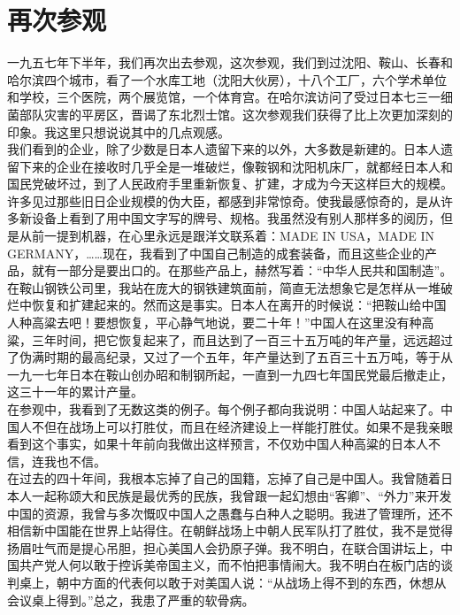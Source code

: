 \fancyhead[RO]{} %
\fancyhead[LE]{} %
\chapter*{再次参观}
\thispagestyle{empty}
一九五七年下半年，我们再次出去参观，这次参观，我们到过沈阳、鞍山、长春和哈尔滨四个城市，看了一个水库工地（沈阳大伙房），十八个工厂，六个学术单位和学校，三个医院，两个展览馆，一个体育宫。在哈尔滨访问了受过日本七三一细菌部队灾害的平房区，晋谒了东北烈士馆。这次参观我们获得了比上次更加深刻的印象。我这里只想说说其中的几点观感。\\

我们看到的企业，除了少数是日本人遗留下来的以外，大多数是新建的。日本人遗留下来的企业在接收时几乎全是一堆破烂，像鞍钢和沈阳机床厂，就都经日本人和国民党破坏过，到了人民政府手里重新恢复、扩建，才成为今天这样巨大的规模。许多见过那些旧日企业规模的伪大臣，都感到非常惊奇。使我最感惊奇的，是从许多新设备上看到了用中国文字写的牌号、规格。我虽然没有别人那样多的阅历，但是从前一提到机器，在心里永远是跟洋文联系着：MADE IN USA，MADE IN GERMANY，……现在，我看到了中国自己制造的成套装备，而且这些企业的产品，就有一部分是要出口的。在那些产品上，赫然写着：“中华人民共和国制造”。\\

在鞍山钢铁公司里，我站在庞大的钢铁建筑面前，简直无法想象它是怎样从一堆破烂中恢复和扩建起来的。然而这是事实。日本人在离开的时候说：“把鞍山给中国人种高粱去吧！要想恢复，平心静气地说，要二十年！”中国人在这里没有种高粱，三年时间，把它恢复起来了，而且达到了一百三十五万吨的年产量，远远超过了伪满时期的最高纪录，又过了一个五年，年产量达到了五百三十五万吨，等于从一九一七年日本在鞍山创办昭和制钢所起，一直到一九四七年国民党最后撤走止，这三十一年的累计产量。\\

在参观中，我看到了无数这类的例子。每个例子都向我说明：中国人站起来了。中国人不但在战场上可以打胜仗，而且在经济建设上一样能打胜仗。如果不是我亲眼看到这个事实，如果十年前向我做出这样预言，不仅劝中国人种高粱的日本人不信，连我也不信。\\

在过去的四十年间，我根本忘掉了自己的国籍，忘掉了自己是中国人。我曾随着日本人一起称颂大和民族是最优秀的民族，我曾跟一起幻想由“客卿”、“外力”来开发中国的资源，我曾与多次慨叹中国人之愚蠢与白种人之聪明。我进了管理所，还不相信新中国能在世界上站得住。在朝鲜战场上中朝人民军队打了胜仗，我不是觉得扬眉吐气而是提心吊胆，担心美国人会扔原子弹。我不明白，在联合国讲坛上，中国共产党人何以敢于控诉美帝国主义，而不怕把事情闹大。我不明白在板门店的谈判桌上，朝中方面的代表何以敢于对美国人说：“从战场上得不到的东西，休想从会议桌上得到。”总之，我患了严重的软骨病。\\

